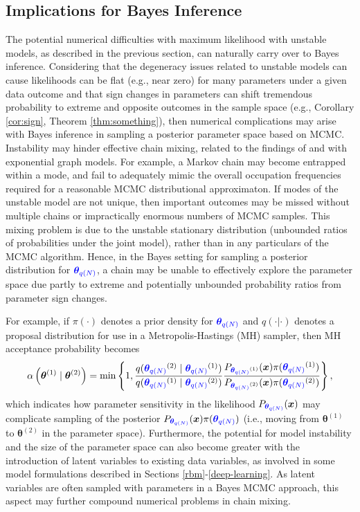 \documentclass[numbib]{imamat}
\theoremstyle{theorem}
\theoremstyle{lemma}
\theoremstyle{example}
\theoremstyle{corollary}
\theoremstyle{definition}
\theoremstyle{remark}
\theoremstyle{approximation}
\theoremstyle{scheme}
\newcommand{\thetaidx}{q(N)}
\newcommand{\thetaN}{\boldsymbol \theta_{\thetaidx}}
\newcommand{\ak}[1]{{\color{blue} #1}}
\begin{document}
\hypertarget{bayes}{%
\subsection{Implications for Bayes Inference}\label{bayes}}

The potential numerical difficulties with maximum likelihood with unstable models, as described in the previous section, can naturally carry over to Bayes inference. Considering that the degeneracy issues related to unstable models can cause likelihoods can be flat (e.g., near zero) for many parameters under a given data outcome and that sign changes in parameters can shift tremendous probability to extreme and opposite outcomes in the sample space (e.g., Corollary \ref{cor:sign}, Theorem \ref{thm:something}), then numerical complications may arise with Bayes inference in sampling a posterior parameter space based on MCMC.
\ak{Instability may hinder effective chain mixing, related to the findings of \citet{handcock2003assessing} and \citet{schweinberger2011instability} with exponential graph models. For example, a Markov chain may become entrapped within a mode, and fail to adequately mimic the overall occupation frequencies required for a reasonable MCMC distributional approximaton. If modes of the unstable model are not unique, then important outcomes may be missed without multiple chains or impractically enormous numbers of MCMC samples. This mixing problem is due to the unstable stationary distribution (unbounded ratios of probabilities under the joint model), rather than in any particulars of the MCMC algorithm. Hence,} in the Bayes setting for sampling a posterior distribution for \(\ak{\thetaN}\), a chain may \ak{be unable} to effectively explore the parameter space due partly to extreme and potentially unbounded probability ratios from parameter sign changes.

For example, if \(\pi(\cdot)\) denotes a prior density for \(\ak{\thetaN}\) and \(q(\cdot | \cdot)\) denotes a proposal distribution for use in a Metropolis-Hastings (MH) sampler, then MH acceptance probability becomes
\[
\alpha\left(\boldsymbol \theta^{(1)} \mid \boldsymbol \theta^{(2)}\right)= \min\left\{1,
\frac{q(\ak{\thetaN}^{(2)} \mid \ak{\thetaN}^{(1)})}{q(\ak{\thetaN}^{(1)} \mid  \ak{\thetaN}^{(2)})}
\frac{P_{\ak{\thetaN}^{(1)}} ( \boldsymbol x ) \pi(\ak{\thetaN}^{(1)}) }{P_{\ak{\thetaN}^{(2)}} (  \boldsymbol x) \pi(\ak{\thetaN}^{(2)}) } \right\},
\]
which indicates how parameter sensitivity in the likelihood \(P_{\ak{\thetaN}} (\boldsymbol x)\) may complicate sampling of the posterior \(P_{ \ak{\thetaN}} ( \boldsymbol x) \pi(\ak{\thetaN})\) (i.e., moving from \(\boldsymbol \theta^{(1)}\) to \(\boldsymbol \theta^{(2)}\) in the parameter space). Furthermore, the potential for model instability and the size of the parameter space can also become greater with the introduction of latent variables to existing data variables, as involved in some model formulations described in Sections \ref{rbm}-\ref{deep-learning}. As latent variables are often sampled with parameters in a Bayes MCMC approach, this aspect may further compound numerical problems in chain mixing.
\end{document}
